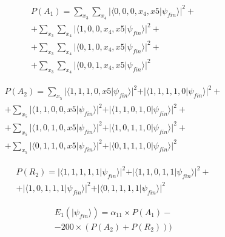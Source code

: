 \documentclass[10pt,twocolumn]{llncs}
\begin{document}
\begin{equation}
\begin{split}
P(A_{1}) = \sum_{x_{3}}\sum_{x_{4}}\vert\langle0,0,0,x_{4},x{5}\vert\psi_{fin}\rangle\vert^{2} + \\  + \sum_{x_{3}}\sum_{x_{4}}\vert\langle1,0,0,x_{4},x{5}\vert\psi_{fin}\rangle\vert^{2} + \\ 
+ \sum_{x_{3}}\sum_{x_{4}}\vert\langle0,1,0,x_{4},x{5}\vert\psi_{fin}\rangle\vert^{2} + \\ 
+ \sum_{x_{3}}\sum_{x_{4}}\vert\langle0,0,1,x_{4},x{5}\vert\psi_{fin}\rangle\vert^{2}
\end{split}
\end{equation}

\begin{equation}
\begin{split}
P(A_{2}) = \sum_{x_{5}}\vert\langle1,1,1,0,x{5}\vert\psi_{fin}\rangle\vert^{2} + \vert\langle1,1,1,1,0\vert\psi_{fin}\rangle\vert^{2} + \\ + \sum_{x_{5}}\vert\langle1,1,0,0,x{5}\vert\psi_{fin}\rangle\vert^{2}+ \vert\langle1,1,0,1,0\vert\psi_{fin}\rangle\vert^{2} + \\ 
+ \sum_{x_{5}}\vert\langle1,0,1,0,x{5}\vert\psi_{fin}\rangle\vert^{2} + \vert\langle1,0,1,1,0\vert\psi_{fin}\rangle\vert^{2}
+ \\ + \sum_{x_{5}}\vert\langle0,1,1,0,x{5}\vert\psi_{fin}\rangle\vert^{2} + \vert\langle0,1,1,1,0\vert\psi_{fin}\rangle\vert^{2}
\end{split}
\end{equation}

\begin{equation}
\begin{split}
P(R_{2}) = \vert\langle1,1,1,1,1\vert\psi_{fin}\rangle\vert^{2} + \vert\langle1,1,0,1,1\vert\psi_{fin}\rangle\vert^{2} + \\ 
+ \vert\langle1,0,1,1,1\vert\psi_{fin}\rangle\vert^{2}
+ \vert\langle0,1,1,1,1\vert\psi_{fin}\rangle\vert^{2}
 \end{split}
\end{equation}


   

 
\begin{equation}
\begin{split}
E_{1}(\vert\psi_{fin}\rangle)=\alpha_{11}\times P(A_{1}) - \\ 
 - 200\times( P(A_{2})  +  P(R_{2}) ) 
 ) 
\end{split}
\label{eq:pirates_payoff32:1}
\end{equation}
\end{document}
